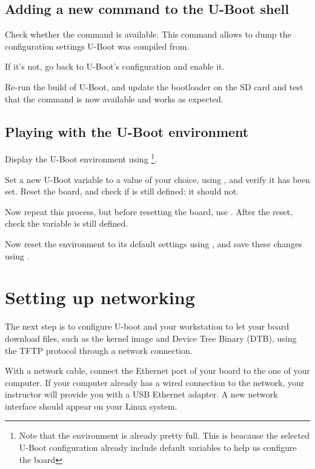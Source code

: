 \subsection{Adding a new command to the U-Boot shell}

Check whether the  command is available. This command
allows to dump the configuration settings U-Boot was compiled from.

If it's not, go back to U-Boot's configuration and enable it.

Re-run the build of U-Boot, and update the bootloader on the SD card
and test that the command is now available and works as expected.

\subsection{Playing with the U-Boot environment}

Display the U-Boot environment using \footnote{Note that
the environment is already pretty full. This is beacause the selected
U-Boot configuration already include default variables to help us configure
the board}.

Set a new U-Boot variable  to a value of your choice, using
, and verify it has been set. Reset the board, and check
if  is still defined: it should not.

Now repeat this process, but before resetting the board, use
. After the reset, check the  variable is
still defined.

Now reset the environment to its default settings using , and save these changes using .

\section{Setting up networking}

The next step is to configure U-boot and your workstation to let your
board download files, such as the kernel image and Device Tree Binary
(DTB), using the TFTP protocol through a network connection.

With a network cable, connect the Ethernet port of
your board to the one of your computer. If your computer already has a
wired connection to the network, your instructor will provide you with
a USB Ethernet adapter. A new network interface should appear on your
Linux system.

